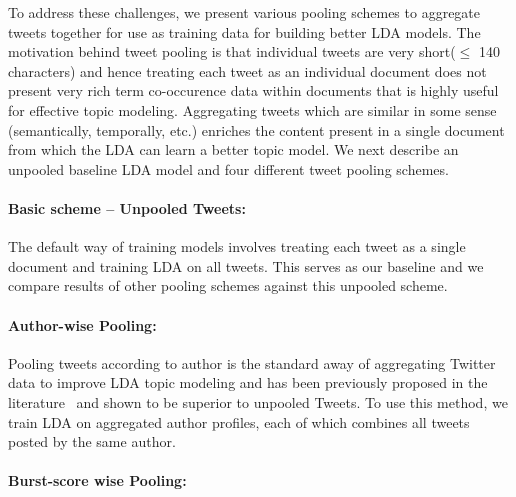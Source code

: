 \documentclass{sig-alternate}
\begin{document}
To address these challenges, we present various pooling schemes to
aggregate tweets together for use as training data for building better
LDA models. The motivation behind tweet pooling is that individual
tweets are very short($\leq$ 140 characters) and hence treating each
tweet as an individual document does not present very rich term
co-occurence data within documents that is highly useful for effective
topic modeling.  Aggregating tweets which are similar in some sense
(semantically, temporally, etc.) enriches the content present in a
single document from which the LDA can learn a better topic model.  We
next describe an unpooled baseline LDA model and four different tweet
pooling schemes.

\paragraph{Basic scheme -- Unpooled Tweets:}

The default way of training models involves treating each tweet as a
single document and training LDA on all tweets. This serves as our
baseline and we compare results of other pooling schemes against this
unpooled scheme. 

\paragraph{Author-wise Pooling: }

Pooling tweets according to author is the standard away of aggregating
Twitter data to improve LDA topic modeling and has been previously
proposed in the literature~\cite{Weng2010wsdm,hong} and shown to be
superior to unpooled Tweets.  To use this method, we train LDA on
aggregated author profiles, each of which combines all tweets posted
by the same author.  

\paragraph{Burst-score wise Pooling:}
\end{document}

